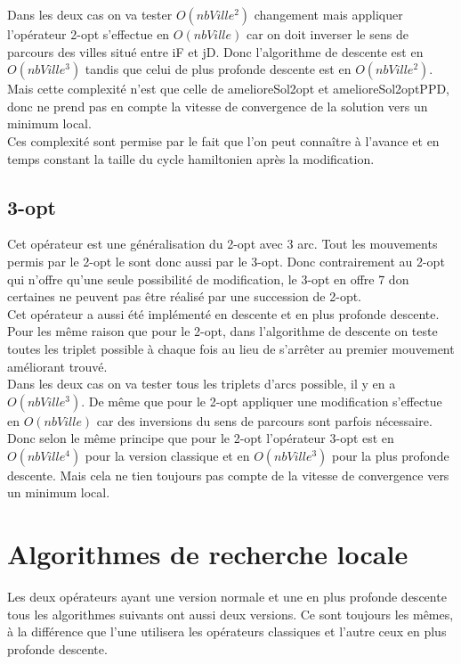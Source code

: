 \documentclass[12pt,a4paper]{article}
\begin{document}
Dans les deux cas on va tester $O(nbVille^2)$ changement mais appliquer l'opérateur 2-opt s’effectue en $O(nbVille)$ car on doit inverser le sens de parcours des villes situé entre iF et jD. Donc l'algorithme de descente est en $O(nbVille^3)$ tandis que celui de plus profonde descente est en $O(nbVille^2)$. Mais cette complexité n'est que celle de amelioreSol2opt et amelioreSol2optPPD, donc ne prend pas en compte la vitesse de convergence de la solution vers un minimum local.\\
Ces complexité sont permise par le fait que l'on peut connaître à l'avance et en temps constant la taille du cycle hamiltonien après la modification.
 
\subsection{3-opt}
Cet opérateur est une généralisation du 2-opt avec 3 arc. Tout les mouvements permis par le 2-opt le sont donc aussi par le 3-opt. Donc contrairement au 2-opt qui n'offre qu'une seule possibilité de modification, le 3-opt en offre 7 don certaines ne peuvent pas être réalisé par une succession de 2-opt.\\

Cet opérateur a aussi été implémenté en descente et en plus profonde descente.\\
Pour les même raison que pour le 2-opt, dans l'algorithme de descente on teste toutes les triplet possible à chaque fois au lieu de s’arrêter au premier mouvement améliorant trouvé.\\

Dans les deux cas on va tester tous les triplets d'arcs possible, il y en a $O(nbVille ^3)$. De même que pour le 2-opt appliquer une modification s'effectue en $O(nbVille)$ car des inversions du sens de parcours sont parfois nécessaire. Donc selon le même principe que pour le 2-opt l'opérateur 3-opt est en $O(nbVille^4)$ pour la version classique et en $O(nbVille^3)$ pour la plus profonde descente. Mais cela ne tien toujours pas compte de la vitesse de convergence vers un minimum local.\\

\section{Algorithmes de recherche locale}

Les deux opérateurs ayant une version normale et une en plus profonde descente tous les algorithmes suivants ont aussi deux versions. Ce sont toujours les mêmes, à la différence que l'une utilisera les opérateurs classiques et l'autre ceux en plus profonde descente.
\end{document}
